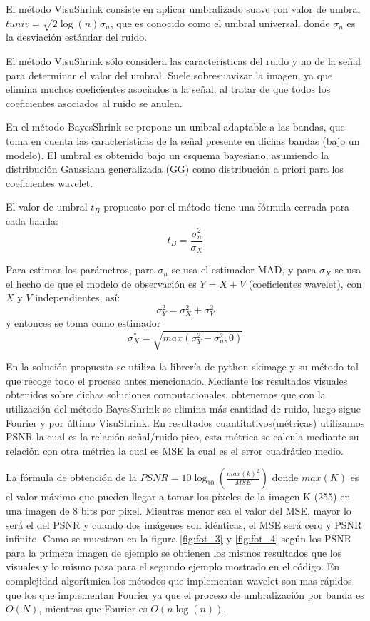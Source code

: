 \documentclass[a4paper,10pt,twocolumn]{article}
\begin{document}
 El método VisuShrink consiste en aplicar umbralizado suave con valor de umbral $tuniv = \sqrt{2\log(n)} \sigma_n$, que es conocido como el umbral universal, donde $\sigma_n$  es la desviación estándar del ruido.

 El método VisuShrink sólo considera las características del ruido y no de la señal para determinar el valor del umbral. Suele sobresuavizar la imagen, ya que elimina muchos coeficientes asociados a la señal, al tratar de que todos los coeficientes asociados al ruido se anulen.
 
 En el método BayesShrink se propone un umbral adaptable a las bandas, que toma en cuenta las características de la señal presente en dichas bandas (bajo un modelo). El umbral es obtenido bajo un esquema bayesiano, asumiendo la distribución Gaussiana generalizada (GG) como distribución a priori para los coeficientes wavelet.
 
 El valor de umbral $t_B$ propuesto por el método tiene una fórmula cerrada para cada banda:
$$t_B =\frac{\sigma_n^2}{\sigma_X}$$
 
 Para estimar los parámetros, para $\sigma_n$ se usa el estimador MAD, y para $\sigma_X$ se usa el hecho de que el modelo de observación es $ Y = X + V$ (coeficientes wavelet), con $X$ y $V$ independientes, así:
$$\sigma_Y^2 = \sigma_X^2 + \sigma_V^2$$ 
y entonces se toma como estimador
$$\sigma_X^*= \sqrt{max(\sigma_Y^2 -\sigma_n^2,0 )}$$

 En la solución propuesta se utiliza la librería de python skimage y su método tal que recoge todo el proceso antes mencionado.
Mediante los resultados visuales obtenidos sobre dichas soluciones computacionales, obtenemos que con la utilización del método BayesShrink  se elimina más cantidad de ruido, luego sigue Fourier y por último VisuShrink. En resultados cuantitativos(métricas) utilizamos PSNR la cual es la relación señal/ruido pico, esta métrica se calcula mediante su relación con otra métrica la cual es MSE la cual es el error cuadrático medio.
 
 La fórmula de obtención de la $PSNR= 10 \log_{10}\left( \frac{max(k)^2}{MSE}\right)$        
donde $max(K)$ es el valor máximo que pueden llegar a tomar los píxeles de la imagen K (255) en una imagen de 8 bits por pixel. Mientras menor sea el valor del MSE, mayor lo será el del PSNR y cuando dos imágenes son idénticas, el MSE será cero y PSNR infinito. Como se muestran en la figura \ref{fig:fot_3} y \ref{fig:fot_4} según los PSNR para la primera imagen de ejemplo se obtienen los mismos resultados que los visuales y lo mismo pasa para el segundo ejemplo mostrado en el código. En complejidad algorítmica los métodos que implementan wavelet son mas rápidos que los que implementan Fourier ya que el proceso de umbralización por banda es $O(N)$, mientras que Fourier es $O(n\log(n))$.    
 
\end{document}
